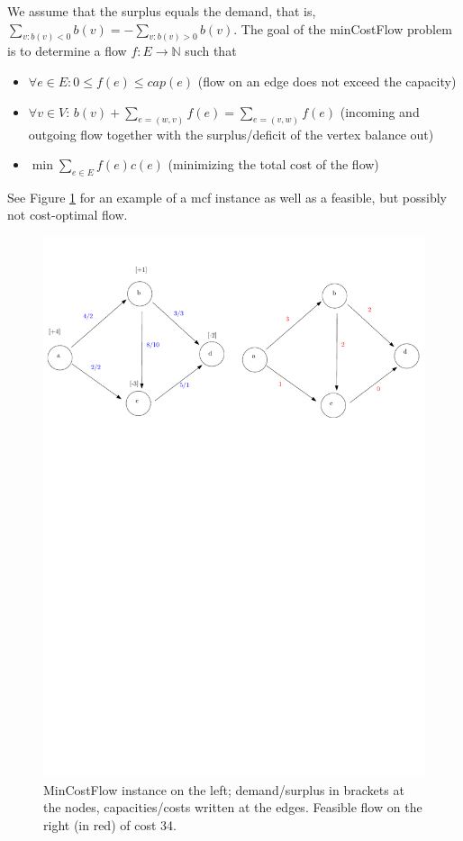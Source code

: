 \documentclass{article}
\begin{document}
We assume that the surplus equals the demand, that is, $\displaystyle \sum_{v:b(v)<0} b(v)=-\sum_{v:b(v)>0} b(v)$.
The goal of the minCostFlow problem is to determine a flow $f:E\rightarrow \mathbb{N}$ such that
\begin{itemize}
\item $\forall e\in E: 0\leq f(e)\leq cap(e)$ (flow on an edge does not exceed the capacity)
\item $\forall v\in V$: $\displaystyle b(v)+\sum_{e=(w,v)}f(e)=\sum_{e=(v,w)}f(e)$ (incoming and outgoing flow together with the surplus/deficit of the vertex balance out)
\item $\displaystyle\min \sum_{e\in E} f(e)c(e)$ (minimizing the total cost of the flow)
\end{itemize}

See Figure \ref{fig:minCostFlow-Ex1} for an example of a mcf instance as well as a feasible, but possibly not cost-optimal flow.

\begin{figure}
\includegraphics[width=\textwidth]{Figs/minCostFlow-Ex1.pdf}
\caption{MinCostFlow instance on the left; demand/surplus in brackets at the nodes, capacities/costs written at the edges. Feasible flow on the right (in red) of cost 34.}\label{fig:minCostFlow-Ex1}
\end{figure}
\end{document}
